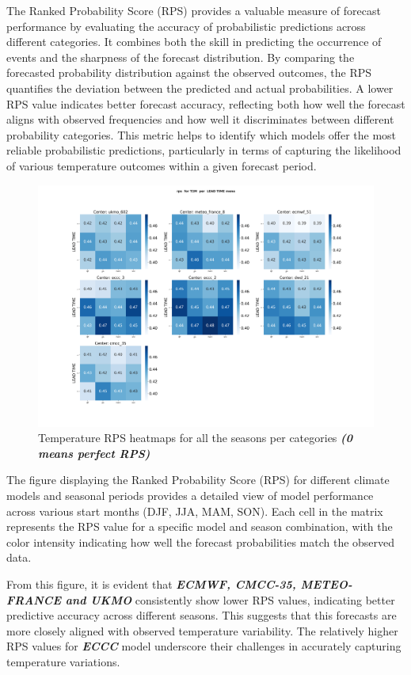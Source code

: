The Ranked Probability Score (RPS) provides a valuable measure of forecast performance by evaluating the accuracy of probabilistic predictions across different categories. It combines both the skill in predicting the occurrence of events and the sharpness of the forecast distribution. By comparing the forecasted probability distribution against the observed outcomes, the RPS quantifies the deviation between the predicted and actual probabilities. A lower RPS value indicates better forecast accuracy, reflecting both how well the forecast aligns with observed frequencies and how well it discriminates between different probability categories. This metric helps to identify which models offer the most reliable probabilistic predictions, particularly in terms of capturing the likelihood of various temperature outcomes within a given forecast period.
\begin{figure}[H]
    \centering
    \includegraphics[width=1\linewidth]{plots/prob/rps/rps_T2M_mena.png}
    \caption{Temperature RPS  heatmaps for all the seasons per categories \textbf{\textit{(0 means perfect RPS)}}}
\end{figure}
The figure displaying the Ranked Probability Score (RPS) for different climate models and seasonal periods provides a detailed view of model performance across various start months (DJF, JJA, MAM, SON). Each cell in the matrix represents the RPS value for a specific model and season combination, with the color intensity indicating how well the forecast probabilities match the observed data.

From this figure, it is evident that \textbf{\textit{ECMWF, CMCC-35, METEO-FRANCE and UKMO}}  consistently show lower RPS values, indicating better predictive accuracy across different seasons. This suggests that this forecasts are more closely aligned with observed temperature variability. The relatively higher RPS values for  \textbf{\textit{ECCC}} model underscore their challenges in accurately capturing temperature variations. 


